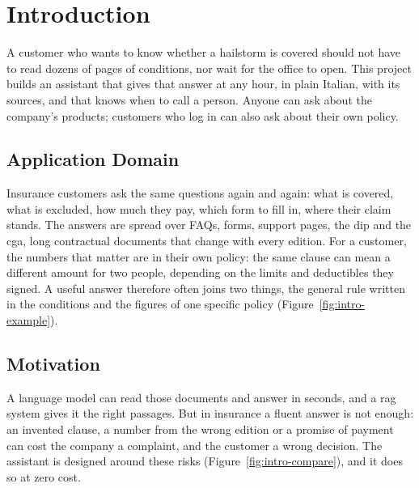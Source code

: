 \chapter*{Introduction}

\begingroup
\setcounter{figure}{0}
\renewcommand\thefigure{I.\arabic{figure}}
\renewcommand\theHfigure{intro.\arabic{figure}}

A customer who wants to know whether a hailstorm is covered should not have to read dozens of
pages of conditions, nor wait for the office to open. This project builds an assistant that gives
that answer at any hour, in plain Italian, with its sources, and that knows when to call a person.
Anyone can ask about the company's products; customers who log in can also ask about their own
policy.

\section*{Application Domain}

Insurance customers ask the same questions again and again: what is covered, what is excluded,
how much they pay, which form to fill in, where their claim stands. The answers are spread over
FAQs, forms, support pages, the \acf{dip} and the \acf{cga}, long contractual documents that change
with every edition. For a customer, the numbers that matter are in their own policy: the same
clause can mean a different amount for two people, depending on the limits and deductibles they
signed. A useful answer therefore often joins two things, the general rule written in the
conditions and the figures of one specific policy (Figure~\ref{fig:intro-example}).



\section*{Motivation}

A language model can read those documents and answer in seconds, and a \ac{rag} system gives it
the right passages. But in insurance a fluent answer is not enough: an invented clause, a number
from the wrong edition or a promise of payment can cost the company a complaint, and the customer
a wrong decision. The assistant is designed around these risks (Figure~\ref{fig:intro-compare}),
and it does so at zero cost.

